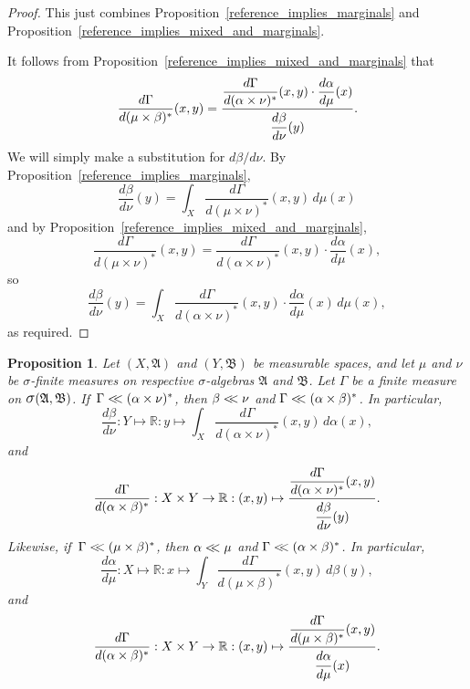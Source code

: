 \documentclass[
twoside=true,
paper=letter,
fontsize=9pt,
pagesize=auto,
leqno,
openany,
headsepline,
overfullrule,
]{scrbook}
\theoremstyle{plain}
\theoremstyle{plain}
\newtheorem{prop}[thm]{Proposition}
\theoremstyle{definition}
\theoremstyle{bfnoteitalic}
\theoremstyle{bfnoteroman}
\newcommand{\sigalg}[1]{\mathfrak{#1}}
\newcommand{\sagb}{\mathop{\hbox{\large{$\sigma$}}}\nolimits}
\newcommand{\textsigma}{\hbox{\large{$\sigma$}}\kern-1pt}
\newcommand{\R}{\mathbb{R}}
\newcommand{\sigmaalgebra}{\sigalg{A}}
\newcommand{\sigmaalgebraii}{\sigalg{B}}
\newcommand{\productsig}[2]{\sagb(#1,#2)}
\newcommand{\lilstrut}{\vphantom{\bigl(}}
\newcommand{\measurespace}{X}
\newcommand{\measurespaceii}{Y}
\newcommand{\mspaceelt}{x}
\newcommand{\mspaceeltii}{y}
\newcommand{\abscont}{\mathrel{< \kern-3.5pt <}}
\newcommand{\measure}{\mu}
\newcommand{\measmu}{\mu}
\newcommand{\measureii}{\nu}
\newcommand{\measnu}{\nu}
\newcommand{\joint}{\Gamma}%
\newcommand{\measonprod}{\Gamma}%
\newcommand{\marginalone}{\alpha}%
\newcommand{\marginaltwo}{\beta}%
\begin{document}
\begin{proof}
This just combines Proposition~\ref{reference_implies_marginals} and Proposition~\ref{reference_implies_mixed_and_marginals}.

It follows from Proposition~\ref{reference_implies_mixed_and_marginals} that
\[
\dfrac{d\joint}{d(\measmu\times\marginaltwo)^*}(\mspaceelt,\mspaceeltii)
=
\dfrac{
\dfrac{d\joint}{d(\marginalone\times\measnu)^*}(\mspaceelt,\mspaceeltii)
\cdot
\dfrac{d\marginalone}{d\measmu}(\mspaceelt)
}
{
\dfrac{d \marginaltwo\lilstrut}
{d\measnu}(\mspaceeltii)
}.
\]
We will simply make a substitution for
$d\marginaltwo / d\measnu$.
By Proposition~\ref{reference_implies_marginals},
\[
\frac{d \marginaltwo}
{d\measnu}(\mspaceeltii)
=
\int_{\measurespace}
\frac{d\joint}{d(\measmu\times\measnu)^*}
(\mspaceelt,\mspaceeltii)
\,d\measmu(\mspaceelt)
\]
and by Proposition~\ref{reference_implies_mixed_and_marginals},
\[
\frac{d\joint}{d(\measmu\times\measnu)^*}
(\mspaceelt,\mspaceeltii)
=
\dfrac{d\joint}{d(\marginalone\times\measnu)^*}(\mspaceelt,\mspaceeltii)
\cdot
\dfrac{d\marginalone}{d\measmu}(\mspaceelt),
\]
so
\[
\frac{d \marginaltwo}
{d\measnu}(\mspaceeltii)
=
\displaystyle\int_\measurespace
\dfrac{d\joint}{d(\marginalone\times\measnu)^*}(\mspaceelt,\mspaceeltii)
\cdot
\dfrac{d\marginalone}{d\measmu}(\mspaceelt)\,
d\measmu(\mspaceelt),
\]
as required.
\end{proof}




\begin{prop}\label{mixed_implies_marginal}
Let
$(\measurespace, \sigmaalgebra)$
and
$(\measurespaceii, \sigmaalgebraii)$
be measurable spaces, and let $\measure$ and $\measureii$
be \textsigma-finite measures on  respective \textsigma-algebras
$\sigmaalgebra$ and $\sigmaalgebraii$.
Let $\measonprod$ be a finite measure on
$\productsig{\sigmaalgebra}{\sigmaalgebraii}$.
If\,
$\measonprod \abscont (\marginalone\times\measnu)^*$, then
$\marginaltwo\abscont\measnu$ and
$\measonprod\abscont(\marginalone\times\marginaltwo)^*$. In particular,
\[
\frac{d\marginaltwo}{d\measnu}
: \measurespaceii \mapsto\R
:\mspaceeltii\mapsto
\int_\measurespace
\dfrac{d\measonprod}{d(\marginalone\times\measnu)^*}(\mspaceelt,\mspaceeltii)
\, d\marginalone(\mspaceelt),
\]
and
\[
\frac{d\measonprod}{d(\marginalone\times\marginaltwo)^*}
: \measurespace\times\measurespaceii
\to \R
: (\mspaceelt,\mspaceeltii)\mapsto
\frac{\dfrac{d\measonprod}{d(\marginalone\times\measnu)^*}
(\mspaceelt,\mspaceeltii)}
{\dfrac{d\marginaltwo\lilstrut}{d\measnu}(\mspaceeltii)}.
\]
Likewise,
if\,
$\measonprod \abscont (\measmu\times\marginaltwo)^*$, then
$\marginalone\abscont\measmu$ and
$\measonprod\abscont(\marginalone\times\marginaltwo)^*$. In particular,
\[
\frac{d\marginalone}{d\measmu}
: \measurespace \mapsto\R
:\mspaceelt\mapsto
\int_\measurespaceii
\dfrac{d\measonprod}{d(\measmu\times\marginaltwo)^*}(\mspaceelt,\mspaceeltii)
\, d\marginaltwo(\mspaceeltii),
\]
and
\[
\frac{d\measonprod}{d(\marginalone\times\marginaltwo)^*}
: \measurespace\times\measurespaceii
\to \R
: (\mspaceelt,\mspaceeltii)\mapsto
\frac{\dfrac{d\joint}{d(\measmu\times\marginaltwo)^*}
(\mspaceelt,\mspaceeltii)}
{\dfrac{d\marginalone\lilstrut}{d\measmu}(\mspaceelt)}.
\]
\end{prop}
\end{document}
